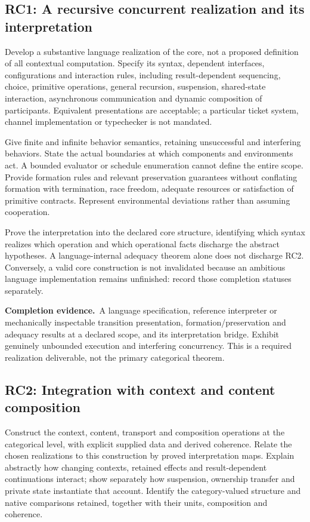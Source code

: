 \documentclass[11pt,a4paper]{article}
\newcommand{\deliver}{\par\textbf{Completion evidence.}\ }
\begin{document}
\subsection*{RC1: A recursive concurrent realization and its interpretation}\label{rc1}
Develop a substantive language realization of the core, not a proposed definition of all contextual computation. Specify its syntax, dependent interfaces, configurations and interaction rules, including result-dependent sequencing, choice, primitive operations, general recursion, suspension, shared-state interaction, asynchronous communication and dynamic composition of participants. Equivalent presentations are acceptable; a particular ticket system, channel implementation or typechecker is not mandated.

Give finite and infinite behavior semantics, retaining unsuccessful and interfering behaviors. State the actual boundaries at which components and environments act. A bounded evaluator or schedule enumeration cannot define the entire scope. Provide formation rules and relevant preservation guarantees without conflating formation with termination, race freedom, adequate resources or satisfaction of primitive contracts. Represent environmental deviations rather than assuming cooperation.

Prove the interpretation into the declared core structure, identifying which syntax realizes which operation and which operational facts discharge the abstract hypotheses. A language-internal adequacy theorem alone does not discharge RC2. Conversely, a valid core construction is not invalidated because an ambitious language implementation remains unfinished: record those completion statuses separately.

\deliver A language specification, reference interpreter or mechanically inspectable transition presentation, formation/preservation and adequacy results at a declared scope, and its interpretation bridge. Exhibit genuinely unbounded execution and interfering concurrency. This is a required realization deliverable, not the primary categorical theorem.

\subsection*{RC2: Integration with context and content composition}\label{rc2}
Construct the context, content, transport and composition operations at the categorical level, with explicit supplied data and derived coherence. Relate the chosen realizations to this construction by proved interpretation maps. Explain abstractly how changing contexts, retained effects and result-dependent continuations interact; show separately how suspension, ownership transfer and private state instantiate that account. Identify the category-valued structure and native comparisons retained, together with their units, composition and coherence.
\end{document}
